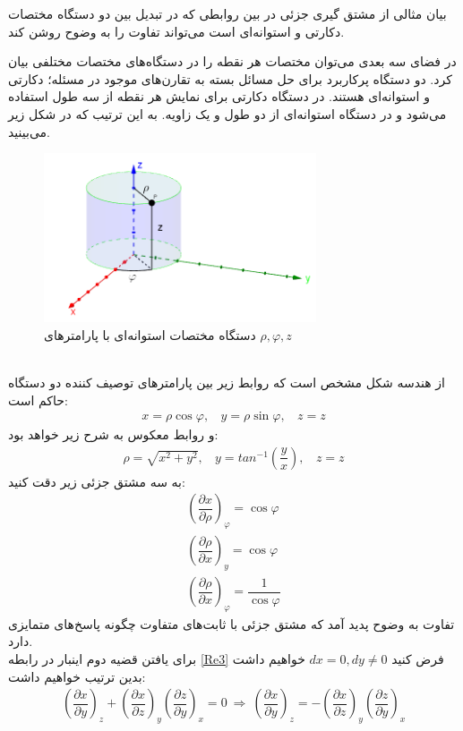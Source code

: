 \documentclass[12pt,a4paper]{article}							   %
\begin{document}
بیان مثالی از مشتق گیری جزئی در بین روابطی که در تبدیل بین دو دستگاه مختصات دکارتی و استوانه‌ای است می‌تواند 
تفاوت را به وضوح روشن کند.\\
\par
در فضای سه بعدی می‌توان مختصات هر نقطه را در دستگاه‌های مختصات مختلفی بیان کرد. دو دستگاه پرکاربرد برای حل مسائل بسته به تقارن‌های موجود در مسئله؛ دکارتی و استوانه‌ای هستند. در دستگاه دکارتی برای نمایش هر نقطه از سه طول استفاده می‌شود و در دستگاه استوانه‌ای از دو طول و یک زاویه. به این ترتیب که در شکل زیر می‌بینید.\\
\begin{figure}[h!]
\centering
\includegraphics*[height=5cm]{Im1}
\caption
{
دستگاه مختصات استوانه‌ای با پارامترهای
$\rho,\varphi,z$
}
\end{figure}
\\
از هندسه شکل مشخص است که روابط زیر بین پارامترهای توصیف کننده دو دستگاه حاکم است:
\begin{align*}
x=\rho \cos \varphi,~~~~y=\rho \sin \varphi,~~~~z=z
\end{align*}
و روابط معکوس به شرح زیر خواهد بود:
\begin{align*}
\rho=\sqrt{x^{2}+y^{2}},~~~~y=tan^{-1} \left( \dfrac{y}{x}\right) ,~~~~z=z
\end{align*}
به سه مشتق جزئی زیر دقت کنید:
\begin{align*}
\left(\dfrac{\partial x}{\partial \rho}\right)_{\varphi}=\cos \varphi\\
\left(\dfrac{\partial \rho}{\partial x}\right)_{y}=\cos \varphi\\
\left(\dfrac{\partial \rho}{\partial x}\right)_{\varphi}=\dfrac{1}{\cos \varphi}
\end{align*}
تفاوت به وضوح پدید آمد که مشتق جزئی با ثابت‌‌های متفاوت چگونه پاسخ‌های متمایزی دارد.
\\
برای یافتن قضیه دوم اینبار در رابطه
\eqref{Re3}
فرض کنید
$ dx=0 , dy\neq 0 $
خواهیم داشت بدین ترتیب خواهیم داشت:
\begin{align}\label{Re5}
\left(\dfrac{\partial x}{\partial y}\right)_{z}+\left(\dfrac{\partial x}{\partial z}\right)_{y}\left(\dfrac{\partial z}{\partial y}\right)_{x}=0
~\Rightarrow~
\left(\dfrac{\partial x}{\partial y}\right)_{z}=-\left(\dfrac{\partial x}{\partial z}\right)_{y}\left(\dfrac{\partial z}{\partial y}\right)_{x}
\end{align}
\end{document}
